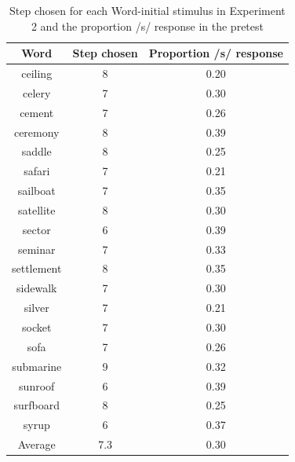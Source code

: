 \begin{table}[ht]
\caption{Step chosen for each Word-initial stimulus in Experiment 2 and the proportion /s/ response in the pretest}
\label{tbl:exp2srespinitial}
\centering
\begin{tabular}{ccc}
\toprule
 Word & Step chosen & Proportion /s/ response \\
\midrule
 ceiling & 8 & 0.20 \\
 celery & 7 & 0.30 \\
 cement & 7 & 0.26 \\
 ceremony & 8 & 0.39 \\
 saddle & 8 & 0.25 \\
 safari & 7 & 0.21 \\
 sailboat & 7 & 0.35 \\
satellite & 8 & 0.30 \\
 sector & 6 & 0.39 \\
 seminar & 7 & 0.33 \\
 settlement & 8 & 0.35 \\
 sidewalk & 7 & 0.30 \\
 silver & 7 & 0.21 \\
 socket & 7 & 0.30 \\
 sofa & 7 & 0.26 \\
 submarine & 9 & 0.32 \\
 sunroof & 6 & 0.39 \\
 surfboard & 8 & 0.25 \\
 syrup & 6 & 0.37 \\
\midrule
Average  & 7.3 & 0.30 \\

\bottomrule
\end{tabular}
\end{table}


